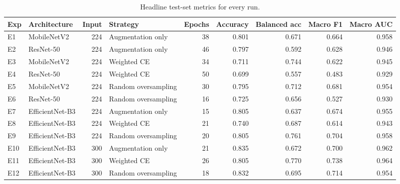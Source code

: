 \begin{table}
\caption{Headline test-set metrics for every run.}
\label{tab:headline}
\begin{tabular}{llrlrrrrr}
\toprule
Exp & Architecture & Input & Strategy & Epochs & Accuracy & Balanced acc & Macro F1 & Macro AUC \\
\midrule
E1 & MobileNetV2 & 224 & Augmentation only & 38 & 0.801 & 0.671 & 0.664 & 0.958 \\
E2 & ResNet-50 & 224 & Augmentation only & 46 & 0.797 & 0.592 & 0.628 & 0.946 \\
E3 & MobileNetV2 & 224 & Weighted CE & 34 & 0.711 & 0.744 & 0.622 & 0.945 \\
E4 & ResNet-50 & 224 & Weighted CE & 50 & 0.699 & 0.557 & 0.483 & 0.929 \\
E5 & MobileNetV2 & 224 & Random oversampling & 30 & 0.795 & 0.712 & 0.681 & 0.954 \\
E6 & ResNet-50 & 224 & Random oversampling & 16 & 0.725 & 0.656 & 0.527 & 0.930 \\
E7 & EfficientNet-B3 & 224 & Augmentation only & 15 & 0.805 & 0.637 & 0.674 & 0.955 \\
E8 & EfficientNet-B3 & 224 & Weighted CE & 21 & 0.740 & 0.687 & 0.614 & 0.943 \\
E9 & EfficientNet-B3 & 224 & Random oversampling & 20 & 0.805 & 0.761 & 0.704 & 0.958 \\
E10 & EfficientNet-B3 & 300 & Augmentation only & 21 & 0.835 & 0.672 & 0.700 & 0.962 \\
E11 & EfficientNet-B3 & 300 & Weighted CE & 26 & 0.805 & 0.770 & 0.738 & 0.964 \\
E12 & EfficientNet-B3 & 300 & Random oversampling & 18 & 0.832 & 0.695 & 0.714 & 0.954 \\
\bottomrule
\end{tabular}
\end{table}
